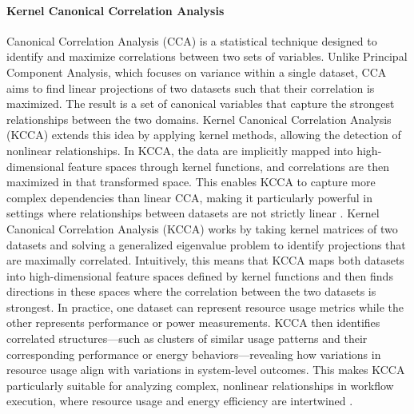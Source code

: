 \paragraph{Kernel Canonical Correlation Analysis}
\label{sec:background_ml_kcca}
Canonical Correlation Analysis (CCA) is a statistical technique designed to identify and maximize correlations between two sets of variables. Unlike Principal Component Analysis, which focuses on variance within a single dataset, CCA aims to find linear projections of two datasets such that their correlation is maximized. The result is a set of canonical variables that capture the strongest relationships between the two domains. Kernel Canonical Correlation Analysis (KCCA) extends this idea by applying kernel methods, allowing the detection of nonlinear relationships. In KCCA, the data are implicitly mapped into high-dimensional feature spaces through kernel functions, and correlations are then maximized in that transformed space. This enables KCCA to capture more complex dependencies than linear CCA, making it particularly powerful in settings where relationships between datasets are not strictly linear \cite{1202783}.
Kernel Canonical Correlation Analysis (KCCA) works by taking kernel matrices of two datasets and solving a generalized eigenvalue problem to identify projections that are maximally correlated. Intuitively, this means that KCCA maps both datasets into high-dimensional feature spaces defined by kernel functions and then finds directions in these spaces where the correlation between the two datasets is strongest. In practice, one dataset can represent resource usage metrics while the other represents performance or power measurements. KCCA then identifies correlated structures—such as clusters of similar usage patterns and their corresponding performance or energy behaviors—revealing how variations in resource usage align with variations in system-level outcomes. This makes KCCA particularly suitable for analyzing complex, nonlinear relationships in workflow execution, where resource usage and energy efficiency are intertwined \cite{5644899}.
